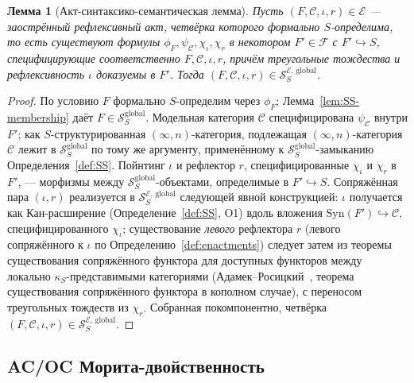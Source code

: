 \documentclass[11pt]{article}
\theoremstyle{plain}
\newtheorem{lemma}[theorem]{Лемма}
\theoremstyle{definition}
\newcommand{\cS}{\mathcal{S}}
\newcommand{\cF}{\mathcal{F}}
\newcommand{\cC}{\mathcal{C}}
\newcommand{\Syn}{\mathrm{Syn}}
\newcommand{\cE}{\mathcal{E}}
\newcommand{\SSEglobal}{\cS_{S}^{\cE,\,\mathrm{global}}}
\begin{document}
\begin{lemma}[Акт-синтаксико-семантическая лемма]\label{lem:SS-membership-E}
Пусть $(F, \cC, \iota, r) \in \cE$ — заострённый рефлексивный акт, четвёрка которого формально $S$-определима, то есть существуют формулы $\phi_F, \psi_\cC, \chi_\iota, \chi_r$ в некотором $F' \in \cF$ с $F' \hookrightarrow S$, специфицирующие соответственно $F, \cC, \iota, r$, причём треугольные тождества и рефлексивность $\iota$ доказуемы в $F'$. Тогда $(F, \cC, \iota, r) \in \SSEglobal$.
\end{lemma}

\begin{proof}
По условию $F$ формально $S$-определим через $\phi_F$; Лемма~\ref{lem:SS-membership} даёт $F \in \cS_S^{\mathrm{global}}$. Модельная категория $\cC$ специфицирована $\psi_\cC$ внутри $F'$; как $S$-структурированная $(\infty, n)$-категория, подлежащая $(\infty, n)$-категория $\cC$ лежит в $\cS_S^{\mathrm{global}}$ по тому же аргументу, применённому к $\cS_S^{\mathrm{global}}$-замыканию Определения~\ref{def:SS}. Пойнтинг $\iota$ и рефлектор $r$, специфицированные $\chi_\iota$ и $\chi_r$ в $F'$, — морфизмы между $\cS_S^{\mathrm{global}}$-объектами, определимые в $F' \hookrightarrow S$. Сопряжённая пара $(\iota, r)$ реализуется в $\SSEglobal$ следующей явной конструкцией: $\iota$ получается как Кан-расширение (Определение~\ref{def:SS}, O1) вдоль вложения $\Syn(F') \hookrightarrow \cC$, специфицированного $\chi_\iota$; существование \emph{левого} рефлектора $r$ (левого сопряжённого к $\iota$ по Определению~\ref{def:enactments}) следует затем из теоремы существования сопряжённого функтора для доступных функторов между локально $\kappa_S$-представимыми категориями (Адамек--Росицкий~\cite{AdamekRosicky1994}, теорема существования сопряжённого функтора в кополном случае), с переносом треугольных тождеств из $\chi_r$. Собранная покомпонентно, четвёрка $(F, \cC, \iota, r) \in \SSEglobal$.
\end{proof}

\subsection{AC/OC Морита-двойственность}
\end{document}
